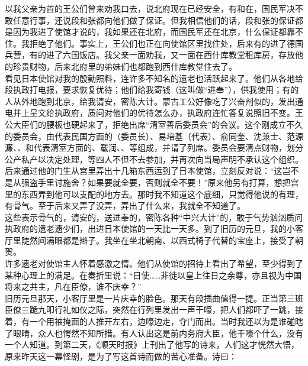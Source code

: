以我父亲为首的王公们曾来劝我口去，说北府现在已经安全，有和在，国民军决不敢任意行事，还说段和张都向他们做了保证。但我相信他们的话，段和张的保证都是因为我进了使馆才说的，我如果还在北府，而国民军还在北京，什么保证都靠不住。我拒绝了他们。事实上，王公们也正在向使馆区里找住处，后来有的进了德国兵营，有的进了六国饭店。我父亲一面劝我，又一面在西什库教堂租库房，存放他的珍贵财物，后来北府里的弟妹们也都跑到西什库教堂住去了。\\

看见日本使馆对我的殷勤照料，连许多不知名的遗老也活跃起来了。他们从各地给段执政打电报，要求恢复优待；他们给我寄钱（这叫做“进奉”），供我使用；有的人从外地跑到北京，给我请安，密陈大计。蒙古工公好像吃了兴奋剂似的，发出通电并上呈文给执政府，质问对他们的优待怎么办，执政府连忙答复说照旧不变。王公大臣们的腰板也硬起来了，拒绝出席“清室善后委员会”的会议。这个刚成立不久的委员会，由代表民国方面的（委员长）、易培基（代表）、俞同奎、沈兼士、范源濂、、和代表清室方面的、载润、、等组成，并请了列席。委员会要清点财物，划分公产私产以决定处理，等四人不但不去参加，并再次向当局声明不承认这个组织。后来通过他的门生从宫里弄出十几箱东西运到了日本使馆，立刻反对说：“这岂不是从强盗手里讨施舍？如果要就全要，否则就全不要！”原来他另有打算，想把宫里的东西弄到他可以支配的地方去。那时我不知道这个底细，只觉得他说的有理，有骨气。至于后来又弄了没弄，弄出了什么来，我就全不知道了。\\

这些表示骨气的，请安的，送进奉的，密陈各种“中兴大计”的，敢于气势汹汹质问执政府的遗老遗少们，出进日本使馆的一天比一天多。到了旧历的元旦，我的小客厅里陡然间满眼都是辫子。我坐在坐北朝南、以西式椅子代替的宝座上，接受了朝贺。\\

许多遗老对使馆主人怀着感激之情。他们从使馆的招待上看出了希望，至少得到了某种心理上的满足。在奏折里说：“日使……非徒以皇上往日之余尊，亦且视为中国将来之共主，凡在臣僚，谁不庆幸？”\\

旧历元旦那天，小客厅里是一片庆幸的脸色。那天有段插曲值得一提。正当第三班臣僚三跪九叩行礼如仪之际，突然在行列里发出一声干嚎，把人们都吓了一跳，接着，有一个用袖掩面的人推开左右，边嚎边走，夺门而出。当时我还以为是谁碰瞎了眼睛，众人也愕然不知所措。有人认出这是前内务府大臣，他干嚎个什么，没有一个人知道。到第二天，《顺天时报》上刊出了他写的诗来，人们这才恍然大悟，原来昨天这一幕怪剧，是为了写这首诗而做的苦心准备。诗曰：\\

